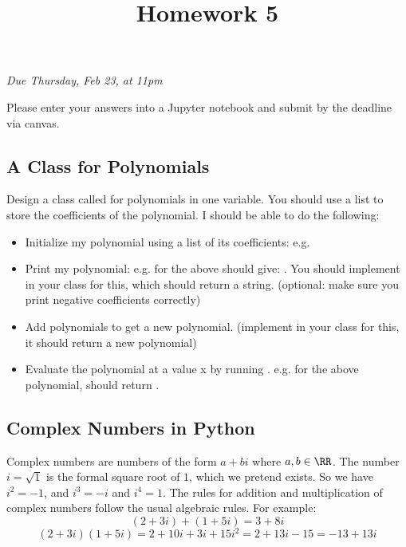 \documentclass[letterpaper,11pt]{amsart}
\title{Homework 5}
\date{}
\theoremstyle{plain}
\theoremstyle{definition}
\begin{document}
\maketitle
\begin{center}
  \emph{Due Thursday, Feb 23, at 11pm}
  \vspace{0.3in}
  \end{center}


\noindent Please enter your answers into a Jupyter notebook and submit by the deadline via canvas. 

\subsection*{A Class for Polynomials} Design a class called  for polynomials in one variable. You should use a list to store the coefficients of the polynomial. I should be able to do the following:
\begin{itemize}
  \item Initialize my polynomial using a list of its coefficients: e.g. 
  \item Print my polynomial: e.g.  for the  above should give: . You should implement  in your class for this, which should return a string. (optional: make sure you print negative coefficients correctly) 
  \item Add polynomials to get a new polynomial. (implement  in your class for this, it should return a new polynomial)
  \item Evaluate the polynomial at a value x by running . e.g. for the above polynomial,  should return .
\end{itemize}

\subsection*{Complex Numbers in Python} 

Complex numbers are numbers of the form $a + bi$ where $a,b \in \RR$. The number $i = \sqrt{1}$ is the formal square root of $1$, which we pretend exists. So we have $i^2 = -1$, and $i^3 = -i$ and $i^4 = 1$. The rules for addition and multiplication of complex numbers follow the usual algebraic rules. For example:
$$(2 + 3i) + (1 + 5i) = 3 + 8i$$
$$(2 + 3i)(1 + 5i) = 2 + 10i + 3i + 15i^2 = 2 + 13i - 15 = -13 + 13i $$
\end{document}
